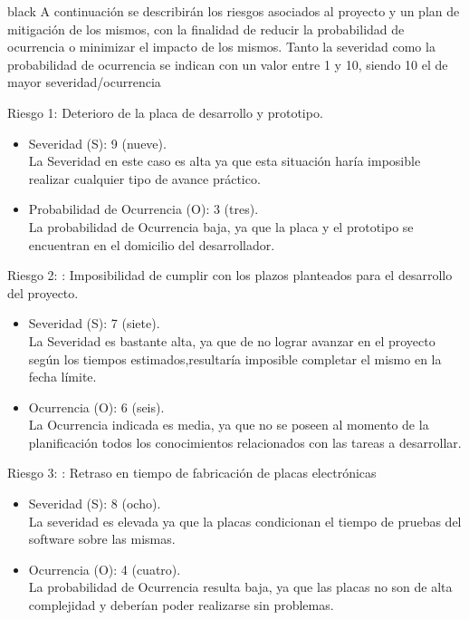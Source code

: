 \documentclass[11pt]{charter}
\begin{document}
\begin{consigna}{black}
A continuación se describirán los riesgos asociados al proyecto y un plan de mitigación de los mismos, con
la finalidad de reducir la probabilidad de ocurrencia o minimizar el impacto de los mismos.
Tanto la severidad como la probabilidad de ocurrencia se indican con un valor entre 1 y 10, siendo 10 el de mayor severidad/ocurrencia 
 
Riesgo 1: Deterioro de la placa de desarrollo y prototipo.

\begin{itemize}
\item Severidad (S): 9 (nueve).\\
La Severidad en este caso es alta ya que esta situación haría imposible realizar cualquier tipo de avance práctico.
\item Probabilidad de Ocurrencia (O): 3 (tres).\\
La probabilidad de Ocurrencia baja, ya que la placa y el prototipo se encuentran en el domicilio del desarrollador. 
\end{itemize}   

Riesgo 2: : Imposibilidad de cumplir con los plazos planteados para el desarrollo del proyecto.
\begin{itemize}
\item Severidad (S):  7 (siete).\\
La Severidad es bastante alta, ya que de no lograr avanzar en el proyecto según los tiempos estimados,resultaría imposible completar el mismo en la fecha límite.
\item Ocurrencia (O): 6 (seis).\\
La Ocurrencia indicada es media, ya que no se poseen al momento de la planificación todos los conocimientos relacionados con las tareas a desarrollar.
\end{itemize}

Riesgo 3: : Retraso en tiempo de fabricación de placas electrónicas
\begin{itemize}
\item Severidad (S):  8 (ocho).\\
La severidad es elevada ya que la placas condicionan el tiempo de pruebas del software sobre las mismas.
\item Ocurrencia (O): 4 (cuatro).\\
La probabilidad de Ocurrencia resulta baja, ya que las placas no son de alta complejidad y deberían poder realizarse sin problemas.
\end{itemize}


\end{consigna}
\end{document}
